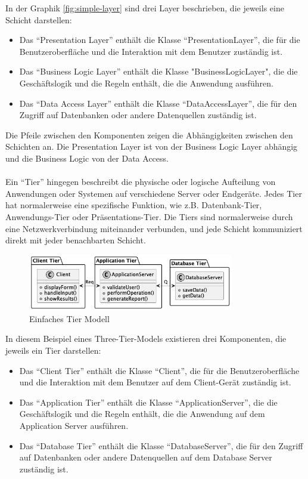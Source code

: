 In der Graphik \ref{fig:simple-layer} sind drei Layer beschrieben, die jeweils eine Schicht darstellen:
\begin{itemize}
\item Das \enquote{Presentation Layer} enthält die Klasse \enquote{PresentationLayer}, die für die Benutzeroberfläche und die Interaktion mit dem Benutzer zuständig ist.

\item Das \enquote{Business Logic Layer} enthält die Klasse "BusinessLogicLayer", die die Geschäftslogik und die Regeln enthält, die die Anwendung ausführen.

\item Das \enquote{Data Access Layer} enthält die Klasse \enquote{DataAccessLayer}, die für den Zugriff auf Datenbanken oder andere Datenquellen zuständig ist.
\end{itemize}
Die Pfeile zwischen den Komponenten zeigen die Abhängigkeiten zwischen den Schichten an. Die Presentation Layer ist von der Business Logic Layer abhängig und die Business Logic von der Data Access.
\\\\
Ein \enquote{Tier} hingegen beschreibt die physische oder logische Aufteilung von Anwendungen oder Systemen auf verschiedene Server oder Endgeräte. Jedes Tier hat normalerweise eine spezifische Funktion, wie z.B. Datenbank-Tier, Anwendungs-Tier oder Präsentations-Tier. Die Tiers sind normalerweise durch eine Netzwerkverbindung miteinander verbunden, und jede Schicht kommuniziert direkt mit jeder benachbarten Schicht.
\begin{figure}[!h]
  \centering
  \includegraphics[width=0.80\textwidth]{fig/uml/simple-tiers.png}
  \caption{Einfaches Tier Modell}
  \label{fig:simple-tier}
\end{figure}
In diesem Beispiel eines Three-Tier-Models existieren drei Komponenten, die jeweils ein Tier darstellen:
\begin{itemize}
\item Das \enquote{Client Tier} enthält die Klasse \enquote{Client}, die für die Benutzeroberfläche und die Interaktion mit dem Benutzer auf dem Client-Gerät zuständig ist.

\item Das \enquote{Application Tier} enthält die Klasse \enquote{ApplicationServer}, die die Geschäftslogik und die Regeln enthält, die die Anwendung auf dem Application Server ausführen.

\item Das \enquote{Database Tier} enthält die Klasse \enquote{DatabaseServer}, die für den Zugriff auf Datenbanken oder andere Datenquellen auf dem Database Server zuständig ist.
\end{itemize}
